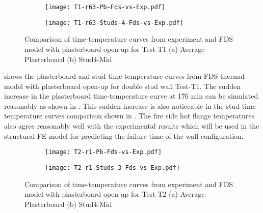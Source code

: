 \begin{figure}[!htbp]
	\centering
	\begin{subfigure}[b]{0.6\textwidth}
		\centering
		\texttt{[image: T1-r63-Pb-Fds-vs-Exp.pdf]}
		\caption{}
		\label{subfig:T1-r63-Pb-Fds-vs-Exp}
	\end{subfigure}
	\begin{subfigure}[b]{0.6\textwidth}
		\centering
		\texttt{[image: T1-r63-Studs-4-Fds-vs-Exp.pdf]}
		\caption{}
		\label{subfig:T1-r63-Studs-4-Fds-vs-Exp}
	\end{subfigure}
	   \caption{Comparison of time-temperature curves from experiment and FDS model with plasterboard open-up for Test-T1 (a) Average Plasterboard (b) Stud4-Mid}
	   \label{fig:T1-fds-output-pbop}
\end{figure}

 shows the plasterboard and stud time-temperature curves from FDS thermal model with plasterboard open-up for double stud wall Test-T1. The sudden increase in the plasterboard time-temperature curve at 176 min can be simulated reasonably as shown in . This sudden increase is also noticeable in the stud time-temperature curves comparison shown in . The fire side hot flange temperatures also agree reasonably well with the experimental results which will be used in the structural FE model for predicting the failure time of the wall configuration.

\begin{figure}[!htbp]
	\centering
	\begin{subfigure}[b]{0.7\textwidth}
		\centering
		\texttt{[image: T2-r1-Pb-Fds-vs-Exp.pdf]}
		\caption{}
		\label{subfig:T2-r1-Pb-Fds-vs-Exp}
	\end{subfigure}
	\begin{subfigure}[b]{0.6\textwidth}
		\centering
		\texttt{[image: T2-r1-Studs-3-Fds-vs-Exp.pdf]}
		\caption{}
		\label{subfig:T2-r1-Studs-3-Fds-vs-Exp}
	\end{subfigure}
	   \caption{Comparison of time-temperature curves from experiment and FDS model with plasterboard open-up for Test-T2 (a) Average Plasterboard (b) Stud4-Mid}
	   \label{fig:T2-fds-output-pbop}
\end{figure}

